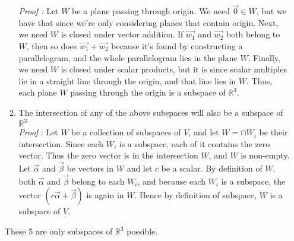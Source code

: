 \documentclass[journal,12pt,twocolumn]{IEEEtran}
\begin{document}
\begin{enumerate}[label=\alph*.]
\begin{enumerate}[label=\arabic*.]
\textit{Proof : }
Let $W$ be a plane passing through origin. We need $\vec{0} \in  W$, but we have that since we’re only considering planes that contain origin. Next, we need $W$ is closed under vector addition. If $\vec{w_1}$ and $\vec{w_2}$ both belong to $W$, then so does $\vec{w_1} + \vec{w_2}$ because it’s found by constructing a parallelogram, and the whole parallelogram lies in the plane $W$. Finally, we need $W$ is closed under
scalar products, but it is since scalar multiples lie in a straight line through the origin, and that line lies in $W$. Thus, each plane $W$ passing through the origin is a subspace of $\mathbb{R}^3$.\\
\item
The intersection of any of the above subspaces will also be a subspace of $\mathbb{R}^3$\\
\textit{Proof} :
Let $W$ be a collection of subspaces of $V$, and let $W = \cap W_i$ be their intersection. Since each $W_i$ is a subspace, each of it contains the zero vector. Thus the zero vector is in the intersection $W$, and $W$ is non-empty. Let $\vec{\alpha}$ and $\vec{\beta}$ be vectors in $W$ and let $c$ be a scalar. By definition of $W$, both $\vec{\alpha}$ and $\vec{\beta}$ belong to each $W_i$, and because each $W_i$ is a subspace, the vector $(c\vec{\alpha} + \vec{\beta})$ is again in $W$. Hence by definition of subspace, $W$ is a subspace of $V$.
\end{enumerate}
These 5 are only subspaces of $\mathbb{R}^3$ possible.
\end{enumerate}
\end{document}
